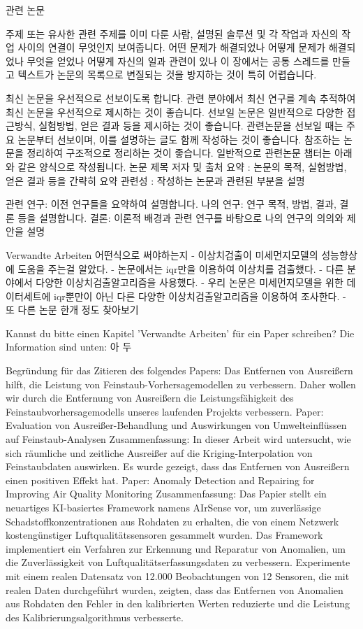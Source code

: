 관련 논문

주제 또는 유사한 관련 주제를 이미 다룬 사람, 설명된 솔루션 및 각 작업과 자신의 작업 사이의 연결이 무엇인지 보여줍니다.
어떤 문제가 해결되었나 어떻게 문제가 해결되었나 무엇을 얻었나 어떻게 자신의 일과 관련이 있나
이 장에서는 공통 스레드를 만들고 텍스트가 논문의 목록으로 변질되는 것을 방지하는 것이 특히 어렵습니다.

최신 논문을 우선적으로 선보이도록 합니다. 관련 분야에서 최신 연구를 계속 추적하여 최신 논문을 우선적으로 제시하는 것이 좋습니다.
선보일 논문은 일반적으로 다양한 접근방식, 실험방법, 얻은 결과 등을 제시하는 것이 좋습니다.
관련논문을 선보일 때는 주요 논문부터 선보이며, 이를 설명하는 글도 함께 작성하는 것이 좋습니다.
참조하는 논문을 정리하여 구조적으로 정리하는 것이 좋습니다.
일반적으로 관련논문 챕터는 아래와 같은 양식으로 작성됩니다.
논문 제목
저자 및 출처
요약 : 논문의 목적, 실험방법, 얻은 결과 등을 간략히 요약
관련성 : 작성하는 논문과 관련된 부분을 설명

관련 연구: 이전 연구들을 요약하여 설명합니다.
나의 연구: 연구 목적, 방법, 결과, 결론 등을 설명합니다.
결론: 이론적 배경과 관련 연구를 바탕으로 나의 연구의 의의와 제안을 설명

Verwandte Arbeiten 어떤식으로 써야하는지
	- 이상치검출이 미세먼지모델의 성능향상에 도움을 주는걸 알았다.
	- 논문에서는 iqr만을 이용하여 이상치를 검출했다.
	- 다른 분야에서 다양한 이상치검출알고리즘을 사용했다.
	- 우리 논문은 미세먼지모델을 위한 데이터세트에 iqr뿐만이 아닌
	  다른 다양한 이상치검출알고리즘을 이용하여 조사한다.
	- 또 다른 논문 한개 정도 찾아보기

Kannst du bitte einen Kapitel 'Verwandte Arbeiten' für ein Paper schreiben? Die Information sind unten:
아 두

Begründung für das Zitieren des folgendes Papers: Das Entfernen von Ausreißern hilft, die Leistung von Feinstaub-Vorhersagemodellen zu verbessern. Daher wollen wir durch die Entfernung von Ausreißern die Leistungsfähigkeit des Feinstaubvorhersagemodells unseres laufenden Projekts verbessern.
Paper: Evaluation von Ausreißer-Behandlung und Auswirkungen von Umwelteinflüssen auf Feinstaub-Analysen
Zusammenfassung: In dieser Arbeit wird untersucht, wie sich räumliche und zeitliche Ausreißer auf die Kriging-Interpolation von Feinstaubdaten auswirken. Es wurde gezeigt, dass das Entfernen von Ausreißern einen positiven Effekt hat.
Paper: Anomaly Detection and Repairing for Improving Air Quality Monitoring
Zusammenfassung: Das Papier stellt ein neuartiges KI-basiertes Framework namens AIrSense vor, um zuverlässige Schadstoffkonzentrationen aus Rohdaten zu erhalten, die von einem Netzwerk kostengünstiger Luftqualitätssensoren gesammelt wurden. Das Framework implementiert ein Verfahren zur Erkennung und Reparatur von Anomalien, um die Zuverlässigkeit von Luftqualitätserfassungsdaten zu verbessern. Experimente mit einem realen Datensatz von 12.000 Beobachtungen von 12 Sensoren, die mit realen Daten durchgeführt wurden, zeigten, dass das Entfernen von Anomalien aus Rohdaten den Fehler in den kalibrierten Werten reduzierte und die Leistung des Kalibrierungsalgorithmus verbesserte.

